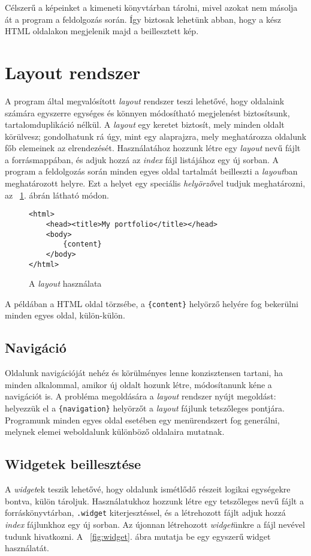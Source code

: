 \documentclass[a4paper,10pt]{article}
\begin{document}
Célszerű a képeinket a kimeneti könyvtárban tárolni, mivel azokat nem másolja át a program a feldolgozás során. Így biztosak lehetünk abban, hogy a kész HTML oldalakon megjelenik majd a beillesztett kép.

\section{Layout rendszer}
\label{sec:layout}
A program által megvalósított \emph{layout} rendszer teszi lehetővé, hogy oldalaink számára egyszerre egységes és könnyen módosítható megjelenést biztosítsunk, tartalomduplikáció nélkül. A \emph{layout} egy keretet biztosít, mely minden oldalt körülvesz; gondolhatunk rá úgy, mint egy alaprajzra, mely meghatározza oldalunk főb elemeinek az elrendezését. Használatához hozzunk létre egy \emph{layout} nevű fájlt a forrásmappában, és adjuk hozzá az \emph{index} fájl listájához egy új sorban.
A program a feldolgozás során minden egyes oldal tartalmát beilleszti a \emph{layout}ban meghatározott helyre. Ezt a helyet egy speciális \emph{helyörző}vel tudjuk meghatározni, az ~\ref{fig:layout}. ábrán látható módon.

\begin{figure}[h]
	\begin{center}
		\begin{lstlisting}
<html>
	<head><title>My portfolio</title></head>
	<body>
		{content}
	</body>
</html>
		\end{lstlisting}
		\caption{A \emph{layout} használata}
		\label{fig:layout}
	\end{center}
\end{figure}

A példában a HTML oldal törzsébe, a \texttt{\{content\}} helyörző helyére fog bekerülni minden egyes oldal, külön-külön.

\subsection{Navigáció}
Oldalunk navigációját nehéz és körülményes lenne konzisztensen tartani, ha minden alkalommal, amikor új oldalt hozunk létre, módosítanunk kéne a navigációt is. A probléma megoldására a \emph{layout} rendszer nyújt megoldást: helyezzük el a \texttt{\{navigation\}} helyörzőt a \emph{layout} fájlunk tetszőleges pontjára. Programunk minden egyes oldal esetében egy menürendszert fog generálni, melynek elemei weboldalunk különböző oldalaira mutatnak.

\subsection{Widgetek beillesztése}
A \emph{widget}ek teszik lehetővé, hogy oldalunk ismétlődő részeit logikai egységekre bontva, külön tároljuk. Használatukhoz hozzunk létre egy tetszőleges nevű fájlt a forráskönyvtárban, \texttt{.widget} kiterjesztéssel, és a létrehozott fájlt adjuk hozzá \emph{index} fájlunkhoz egy új sorban. Az újonnan létrehozott \emph{widget}ünkre a fájl nevével tudunk hivatkozni. A ~\ref{fig:widget}. ábra mutatja be egy egyszerű widget használatát.
\end{document}
